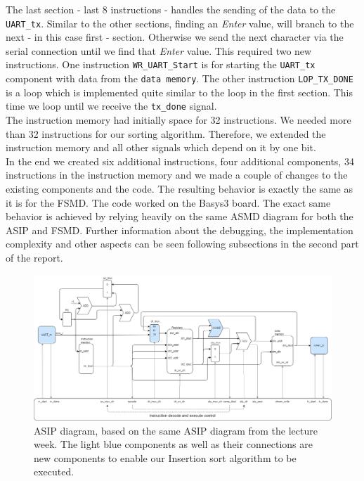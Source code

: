 \documentclass[conference]{IEEEtran}
\begin{document}
The last section - last 8 instructions - handles the sending of the data to the \texttt{UART\_tx}. Similar to the other sections, finding an \textit{Enter} value, will branch to the next - in this case first - section. Otherwise we send the next character via the serial connection until we find that \textit{Enter} value. This required two new instructions. One instruction \texttt{WR\_UART\_Start} is for starting the \texttt{UART\_tx} component with data from the \texttt{data memory}. The other instruction \texttt{LOP\_TX\_DONE} is a loop which is implemented quite similar to the loop in the first section. This time we loop until we receive the \texttt{tx\_done} signal.\\
The instruction memory had initially space for 32 instructions. We needed more than 32 instructions for our sorting algorithm. Therefore, we extended the instruction memory and all other signals which depend on it by one bit. \\
In the end we created six additional instructions, four additional components, 34 instructions in the instruction memory and we made a couple of changes to the existing components and the code. The resulting behavior is exactly the same as it is for the FSMD. The code worked on the Basys3 board. The exact same behavior is achieved by relying heavily on the same ASMD diagram for both the ASIP and FSMD. Further information about the debugging, the implementation complexity and other aspects can be seen following subsections in the second part of the report. \\

\begin{figure}
    \centering
    \includegraphics[width=1\linewidth]{Images/ASIP.png}
    \caption{ASIP diagram, based on the same ASIP diagram from the lecture week. The light blue components as well as their connections are new components to enable our Insertion sort algorithm to be executed.}
    \label{fig:asip}
\end{figure}
\end{document}
